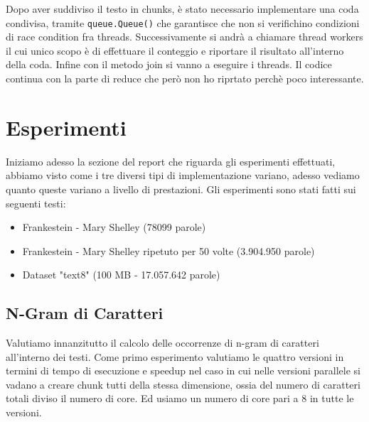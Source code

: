 \documentclass[10pt,twocolumn,letterpaper]{article}
\begin{document}
Dopo aver suddiviso il testo in chunks, è stato necessario implementare una coda condivisa, tramite \lstinline{queue.Queue()} che garantisce che non si verifichino condizioni di race condition fra threads. Successivamente si andrà a chiamare thread workers il cui unico scopo è di effettuare il conteggio e riportare il risultato all'interno della coda. Infine con il metodo join si vanno a eseguire i threads. Il codice continua con la parte di reduce che però non ho riprtato perchè poco interessante.


\section{Esperimenti}
Iniziamo adesso la sezione del report che riguarda gli esperimenti effettuati, abbiamo visto come i tre diversi tipi di implementazione variano, adesso vediamo quanto queste variano a livello di prestazioni.
Gli esperimenti sono stati fatti sui seguenti testi:
\begin{itemize}
    \item Frankestein - Mary Shelley (78099 parole)
    \item Frankestein - Mary Shelley ripetuto per 50 volte (3.904.950 parole)
    \item Dataset "text8" (100 MB - 17.057.642 parole)
\end{itemize}
\subsection{N-Gram di Caratteri}
Valutiamo innanzitutto il calcolo delle occorrenze di n-gram di caratteri all'interno dei testi.
Come primo esperimento valutiamo le quattro versioni in termini di tempo di esecuzione e speedup nel caso in cui nelle versioni parallele si vadano a creare chunk tutti della stessa dimensione, ossia del numero di caratteri totali diviso il numero di core. Ed usiamo un numero di core pari a 8 in tutte le versioni.
\end{document}
